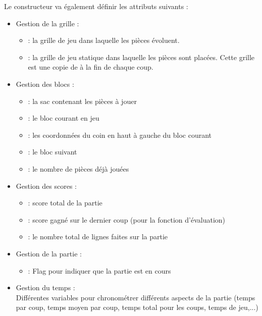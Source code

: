 Le constructeur va également définir les attributs suivants :
\begin{itemize}
	\item Gestion de la grille :
	\begin{itemize}
		\item {} : la grille de jeu dans laquelle les pièces évoluent.
		\item {} : la grille de jeu statique dans laquelle les pièces sont placées. Cette grille est une copie de  à la fin de chaque coup.
	\end{itemize}
	\item Gestion des blocs :
	\begin{itemize}
		\item {} : la sac contenant les pièces à jouer
		\item {} : le bloc courant en jeu
		\item {} : les coordonnées du coin en haut à gauche du bloc courant
		\item {} : le bloc suivant
		\item {} : le nombre de pièces déjà jouées
	\end{itemize}
	\item Gestion des scores :
	\begin{itemize}
		\item {} : score total de la partie
		\item {} : score gagné sur le dernier coup (pour la fonction d'évaluation)
		\item {} : le nombre total de lignes faites sur la partie 
	\end{itemize}
	\item Gestion de la partie :
	\begin{itemize}
		\item {} : Flag pour indiquer que la partie est en cours
	\end{itemize}
	\item Gestion du temps :\\
	Différentes variables pour chronométrer différents aspects de la partie (temps par coup, temps moyen par coup, temps total pour les coups, temps de jeu,...) 
\end{itemize}

